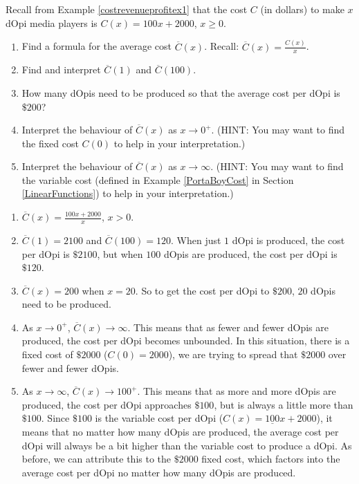 {Recall from Example \ref{costrevenueprofitex1} that the cost $C$ (in dollars) to make $x$ dOpi media players is $C(x) = 100x+2000$, $x \geq 0$.  

\begin{enumerate}

\item  Find a formula for the average cost $\overline{C}(x)$. Recall:  $\overline{C}(x) = \frac{C(x)}{x}$.

\item  Find and interpret $\overline{C}(1)$ and $\overline{C}(100)$.

\item  How many dOpis need to be produced so that the average cost per dOpi is $\$ 200$?

\item  Interpret the behaviour of $\overline{C}(x)$ as $x \rightarrow 0^{+}$.  (HINT:  You may want to find the fixed cost $C(0)$ to help in your interpretation.)

\item  Interpret the behaviour of $\overline{C}(x)$ as $x \rightarrow \infty$.  (HINT:  You may want to find the variable cost (defined in Example \ref{PortaBoyCost} in Section \ref{LinearFunctions}) to help in your interpretation.)


\end{enumerate}
}
{\begin{enumerate}

\item $\overline{C}(x) = \frac{100x+2000}{x}$, $x > 0$.

\item  $\overline{C}(1) = 2100$ and $\overline{C}(100) = 120$. When just $1$ dOpi is produced, the cost per dOpi is $\$2100$, but when $100$ dOpis are produced, the cost per dOpi is $\$120$.  

\item  $\overline{C}(x) = 200$ when $x = 20$.  So to get the cost per dOpi to $\$200$, $20$ dOpis need to be produced.

\item  As $x \rightarrow 0^{+}$, $\overline{C}(x) \rightarrow \infty$.  This means that as fewer and fewer dOpis are produced, the cost per dOpi becomes unbounded.  In this situation, there is a fixed cost of $\$2000$ ($C(0) = 2000$), we are trying to spread that $\$2000$ over fewer and fewer dOpis.

\item   As $x \rightarrow \infty$,  $\overline{C}(x) \rightarrow 100^{+}$.  This means that as more and more dOpis are produced, the cost per dOpi approaches $\$100$, but is always a little more than $\$100$.  Since $\$100$ is the variable cost per dOpi ($C(x) = \underline{100}x+2000$), it means that no matter how many dOpis are produced, the average cost per dOpi will always be a bit higher than the variable cost to produce a dOpi.  As before, we can attribute this to the $\$2000$ fixed cost, which factors into the average cost per dOpi no matter how many dOpis are produced.


\end{enumerate}}